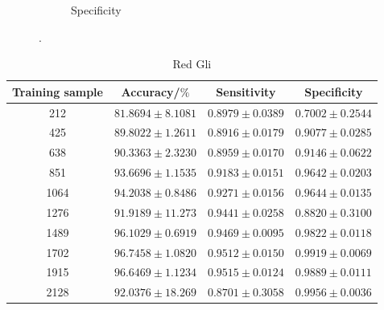 \begin{figure}[H]
\begin{subfigure}[b]{0.48\textwidth}
    \caption{Specificity}
    \label{fig:gli-red-spec}
  \end{subfigure}
  \caption{.}
  \label{fig:gli-men-gliored}
\end{figure}

\begin{table}[H]
    \centering
        \begin{tabular}{cccc}
            \toprule
            Training sample & Accuracy/$\%$ & Sensitivity & Specificity\\
            \midrule
            212  & $81.8694 \pm 8.1081$ & $0.8979 \pm 0.0389$ & $0.7002 \pm 0.2544$ \\
            425  & $89.8022 \pm 1.2611$ & $0.8916 \pm 0.0179$ & $0.9077 \pm 0.0285$ \\
            638  & $90.3363 \pm 2.3230$ & $0.8959 \pm 0.0170$ & $0.9146 \pm 0.0622$ \\
            851  & $93.6696 \pm 1.1535$ & $0.9183 \pm 0.0151$ & $0.9642 \pm 0.0203$ \\
            1064 & $94.2038 \pm 0.8486$ & $0.9271 \pm 0.0156$ & $0.9644 \pm 0.0135$ \\
            1276 & $91.9189 \pm 11.273$ & $0.9441 \pm 0.0258$ & $0.8820 \pm 0.3100$ \\
            1489 & $96.1029 \pm 0.6919$ & $0.9469 \pm 0.0095$ & $0.9822 \pm 0.0118$ \\
            1702 & $96.7458 \pm 1.0820$ & $0.9512 \pm 0.0150$ & $0.9919 \pm 0.0069$ \\
            1915 & $96.6469 \pm 1.1234$ & $0.9515 \pm 0.0124$ & $0.9889 \pm 0.0111$ \\
            2128 & $92.0376 \pm 18.269$ & $0.8701 \pm 0.3058$ & $0.9956 \pm 0.0036$ \\
            \bottomrule
        \end{tabular}
  \caption{Red Gli}
  \label{tab:}
\end{table}

